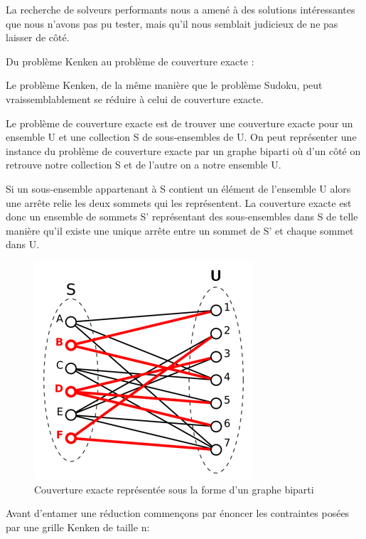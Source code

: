 \documentclass[1]{report}
\begin{document}
    La recherche de solveurs performants nous a amené à des solutions intéressantes que nous n'avons pas pu tester, mais qu'il nous semblait judicieux de ne pas laisser de c\^oté. \newline
    
    Du problème Kenken au problème de couverture exacte : \newline
    
    Le problème Kenken, de la même manière que le problème Sudoku, peut vraissemblablement se réduire à celui de couverture exacte. 
    
    Le problème de couverture exacte est de trouver une couverture exacte pour un ensemble U et une collection S de sous-ensembles de U. On peut représenter une instance du problème de couverture exacte par un graphe biparti où d'un côté on retrouve notre collection S et de l'autre on a notre ensemble U. \newline
    
    Si un sous-ensemble appartenant à S contient un élément de l'ensemble U alors une arrête relie les deux sommets qui les représentent. La couverture exacte est donc un ensemble de sommets S' représentant des sous-ensembles dans S de telle manière qu'il existe une unique arrête entre un sommet de S' et chaque sommet dans U. \newline
    
    \begin{figure}[h]
    \centering
        \includegraphics[scale=0.9]{couvertureexacte.PNG}
        \caption{Couverture exacte représentée sous la forme d'un graphe biparti}
    \end{figure}
    
    
    
    Avant d'entamer une réduction commençons par énoncer les contraintes posées par une grille Kenken de taille n: \newline
    
\end{document}
